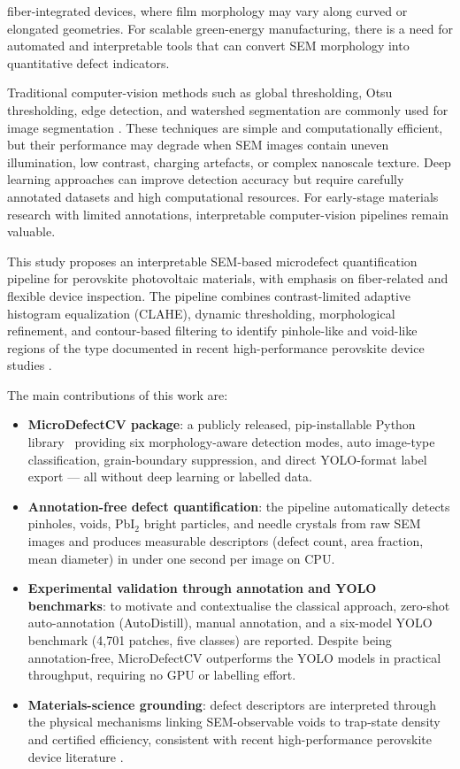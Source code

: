 \documentclass[pdflatex,sn-mathphys-num,iicol]{sn-jnl}
\theoremstyle{thmstyleone}
\theoremstyle{thmstyletwo}
\theoremstyle{thmstylethree}
\begin{document}
fiber-integrated devices, where film morphology may vary along curved
or elongated geometries. For scalable green-energy manufacturing,
there is a need for automated and interpretable tools that can convert
SEM morphology into quantitative defect indicators.

Traditional computer-vision methods such as global thresholding,
Otsu thresholding, edge detection, and watershed segmentation are
commonly used for image segmentation
\cite{otsu1979,canny1986,vincent1991}. These techniques are simple
and computationally efficient, but their performance may degrade when
SEM images contain uneven illumination, low contrast, charging
artefacts, or complex nanoscale texture. Deep learning approaches
can improve detection accuracy but require carefully annotated
datasets and high computational resources. For early-stage materials
research with limited annotations, interpretable computer-vision
pipelines remain valuable.

This study proposes an interpretable SEM-based microdefect
quantification pipeline for perovskite photovoltaic materials, with
emphasis on fiber-related and flexible device inspection. The pipeline
combines contrast-limited adaptive histogram equalization (CLAHE),
dynamic thresholding, morphological refinement, and contour-based
filtering to identify pinhole-like and void-like regions of the type
documented in recent high-performance perovskite device studies
\cite{chang2026,zheng2025}.

The main contributions of this work are:

\begin{itemize}
\item \textbf{MicroDefectCV package}: a publicly released, pip-installable
Python library~\cite{microdefectcv2025} providing six morphology-aware
detection modes, auto image-type classification, grain-boundary
suppression, and direct YOLO-format label export --- all without
deep learning or labelled data.
\item \textbf{Annotation-free defect quantification}: the pipeline
automatically detects pinholes, voids, PbI$_2$ bright particles, and
needle crystals from raw SEM images and produces measurable descriptors
(defect count, area fraction, mean diameter) in under one second per
image on CPU.
\item \textbf{Experimental validation through annotation and YOLO benchmarks}:
to motivate and contextualise the classical approach, zero-shot
auto-annotation (AutoDistill), manual annotation, and a six-model
YOLO benchmark (4{,}701 patches, five classes) are reported. Despite
being annotation-free, MicroDefectCV outperforms the YOLO models in
practical throughput, requiring no GPU or labelling effort.
\item \textbf{Materials-science grounding}: defect descriptors are
interpreted through the physical mechanisms linking SEM-observable
voids to trap-state density and certified efficiency, consistent with
recent high-performance perovskite device literature
\cite{chang2026,zheng2025}.
\end{itemize}
\end{document}
